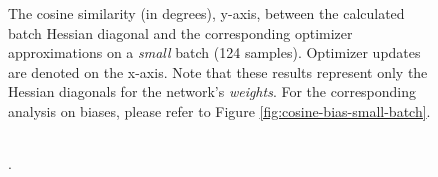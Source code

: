         \begin{figure}[h!]
            \centering
            \begin{tabular}{cc}
                 \\ %
            \end{tabular}
            \caption{The cosine similarity (in degrees), y-axis, between the calculated batch Hessian diagonal and the corresponding optimizer approximations on a \emph{small} batch (124 samples).
            Optimizer updates are denoted on the x-axis.
            Note that these results represent only the Hessian diagonals for the network's \emph{weights}. For the corresponding analysis on biases, please refer to Figure \ref{fig:cosine-bias-small-batch}.
        }
            \label{fig:sapollo-approx-weights}
        \end{figure}

        \begin{figure}[h!]
            \centering
            \begin{tabular}{cc}
                 \\ %
            \end{tabular}
            \caption{
           .
        }
        \end{figure}